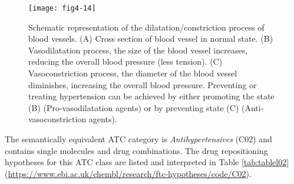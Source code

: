 \begin{figure}[ht]
    \centering
    \texttt{[image: fig4-14]}
    \caption{Schematic representation of the dilatation/constriction process of blood vessels. (A) Cross section of blood vessel in normal state. (B) Vasodilatation process, the size of the blood vessel increases, reducing the overall blood pressure (less tension). (C) Vasoconstriction process, the diameter of the blood vessel diminishes, increasing the overall blood pressure. Preventing or treating hypertension can be achieved by either promoting the state (B) (Pro-vasodilatation agents) or by preventing state (C) (Anti-vasoconstriction agents).}
    \label{fig4-14}
\end{figure}

The semantically equivalent ATC category is \emph{Antihypertensives} (C02) and contains single molecules and drug combinations. The drug repositioning hypotheses for this ATC class are listed and interpreted in Table \ref{tab:tablel02} (\url{https://www.ebi.ac.uk/chembl/research/ftc-hypotheses/code/C02}).

